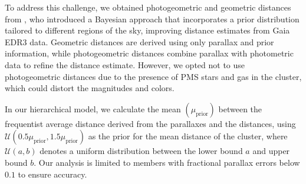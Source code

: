 \documentclass{aa}
\begin{document}
To address this challenge, we obtained photogeometric and geometric distances from \citet{2021AJ....161..147B}, who introduced a Bayesian approach that incorporates a prior distribution tailored to different regions of the sky, improving distance estimates from Gaia EDR3 data. Geometric distances are derived using only parallax and prior information, while photogeometric distances combine parallax with photometric data to refine the distance estimate. However, we opted not to use photogeometric distances due to the presence of PMS stars and gas in the cluster, which could distort the magnitudes and colors.

In our hierarchical model, we calculate the mean $(\mu_{\mathrm{prior}})$ between the frequentist average distance derived from the parallaxes and the distances, using $\mathcal{U}(0.5\mu_{\mathrm{prior}},1.5\mu_{\mathrm{prior}})$ as the prior for the mean distance of the cluster, where $\mathcal{U}(a,b)$ denotes a uniform distribution between the lower bound $a$ and upper bound $b$. Our analysis is limited to members with fractional parallax errors below $0.1$ to ensure accuracy.
\end{document}
